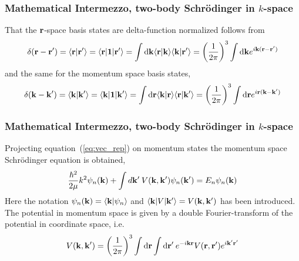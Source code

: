 \documentclass[compress]{beamer}
\begin{document}
\frame
{
\frametitle{Mathematical Intermezzo, two-body Schr\"odinger in $k$-space}
\begin{small}
{\scriptsize
That the ${\bf r}$-space basis states are 
delta-function normalized follows from 
\begin{equation}
  \delta ( {\bf r}-{\bf r'}) = \langle {\bf r} \vert {\bf r}'\rangle = 
  \langle {\bf r} \vert {\bf 1} \vert {\bf r}'\rangle = 
  \int \mathrm{d}{\bf k} \langle {\bf r}\vert {\bf k} \rangle \langle {\bf k}\vert {\bf r}' \rangle = 
  \left( {1\over 2\pi}\right)^3 \int \mathrm{d}{\bf k} e^{i {\bf k}({\bf r} - {\bf r}')} 
\end{equation}
and the same for the momentum space basis states,
\begin{equation}
  \delta ( {\bf k}-{\bf k'}) = \langle {\bf k} \vert {\bf k}'\rangle = 
  \langle {\bf k} \vert {\bf 1} \vert {\bf k}'\rangle = 
  \int \mathrm{d}{\bf r} \langle {\bf k}\vert {\bf r} \rangle \langle {\bf r}\vert {\bf k}' \rangle = 
  \left( {1\over 2\pi}\right)^3 \int \mathrm{d}{\bf r} e^{i {\bf r}({\bf k} - {\bf k}')} 
\end{equation}
}
\end{small}
}




\frame
{
\frametitle{Mathematical Intermezzo, two-body Schr\"odinger in $k$-space}
\begin{small}
{\scriptsize
Projecting equation~(\ref{eq:vec_rep}) on momentum states
the momentum space Schr\"odinger equation is obtained,
\begin{equation}
  {\hbar^2 \over 2\mu} k^2 \psi_n({\bf k})  + 
  \int d{\bf k'}\: V({\bf k}, {\bf k'}) \psi_n({\bf k'}) = 
  E_n \psi_n({\bf k})
  \label{eq:momspace1}
\end{equation}
Here the notation $\psi_n({\bf k}) = \langle {\bf k} \vert \psi_n\rangle $ and 
$ \langle {\bf k} \vert V \vert {\bf k}' \rangle = V({\bf k}, {\bf k'})$ has been introduced.
The potential in momentum space is given by a double Fourier-transform 
of the potential in coordinate space, i.e.
\begin{equation} 
  V ({\bf k}, {\bf k'}) = \left( {1\over 2\pi}\right)^3 \int \mathrm{d}{\bf r}\int \mathrm{d}{\bf r}'\: 
  e^{-i {\bf kr} }V({\bf r},{\bf r}') e^{i{\bf k}'{\bf r}'}  
\end{equation}
}
\end{small}
}
\end{document}
